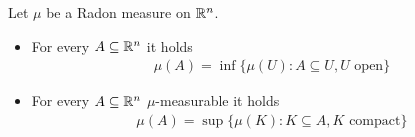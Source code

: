 \begin{thm} \label{thm:radon-open-compact}
  Let $\mu$ be a Radon measure on $\mathbb{R}^{n}$.
  \begin{itemize}
    \item For every $A \subseteq \mathbb{R}^{n}$ it holds
      \begin{align*}
        \mu(A) = \inf \{\mu(U): A \subseteq U, U \text{ open}\}
      \end{align*}
    \item For every $A \subseteq \mathbb{R}^{n}$ $\mu$-measurable it holds
      \begin{align*}
        \mu(A) = \sup \{\mu(K): K \subseteq A, K \text{ compact}\}
      \end{align*} 
  \end{itemize}
\end{thm}

